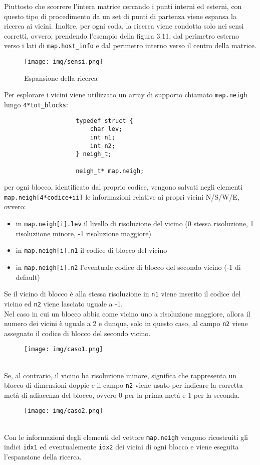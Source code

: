 				Piuttosto che scorrere l'intera matrice cercando i punti interni ed esterni, con questo tipo di procedimento da un set di punti di partenza viene espansa la ricerca ai vicini. Inoltre, per ogni coda, la ricerca viene condotta solo nei sensi corretti, ovvero, prendendo l'esempio della figura 3.11,  dal perimetro esterno verso i lati di \texttt{map.host\_info} e dal perimetro interno verso il centro della matrice.
				\begin{figure}[htbp]
					\centering
					\texttt{[image: img/sensi.png]}
					\caption{Espansione della ricerca}
				\end{figure}

				Per esplorare i vicini viene utilizzato un array di supporto chiamato \texttt{map.neigh} lungo \texttt{4*tot\_blocks}:
				\begin{verbatim}
					typedef struct {
					    char lev;
					    int n1;
					    int n2;
					} neigh_t;

					neigh_t* map.neigh;
				\end{verbatim}
				per ogni blocco, identificato dal proprio codice, vengono salvati negli elementi \texttt{map.neigh[4*codice+ii]} le informazioni relative ai propri vicini N/S/W/E, ovvero:
				\begin{itemize}
					\item in \texttt{map.neigh[i].lev} il livello di risoluzione del vicino (0 stessa risoluzione, 1 risoluziione minore, -1 risoluzione maggiore)
					\item in \texttt{map.neigh[i].n1} il codice di blocco del vicino
					\item in \texttt{map.neigh[i].n2} l'eventuale codice di blocco del secondo vicino (-1 di default)
				\end{itemize}
				Se il vicino di blocco \`{e} alla stessa risoluzione in \texttt{n1} viene inserito il codice del vicino ed \texttt{n2} viene lasciato uguale a -1.\\
				Nel caso in cui un blocco abbia come vicino uno a risoluzione maggiore, allora il numero dei vicini \`{e} uguale a 2 e dunque, solo in questo caso, al campo \texttt{n2} viene assegnato il codice di blocco del secondo vicino. 
				\begin{figure}[htbp]
					\centering
					\texttt{[image: img/caso1.png]}
				\end{figure}\\
				Se, al contrario, il vicino ha risoluzione minore, significa che rappresenta un blocco di dimensioni doppie e il campo \texttt{n2} viene usato per indicare la corretta met\`{a} di adiacenza del blocco, ovvero 0 per la prima met\`{a} e 1 per la seconda.
				\begin{figure}[htbp]
					\centering
					\texttt{[image: img/caso2.png]}
				\end{figure}\\  
				Con le informazioni degli elementi del vettore \texttt{map.neigh} vengono ricostruiti gli indici \texttt{idx1} ed eventualemente \texttt{idx2} dei vicini di ogni blocco e viene eseguita l'espansione della ricerca.

